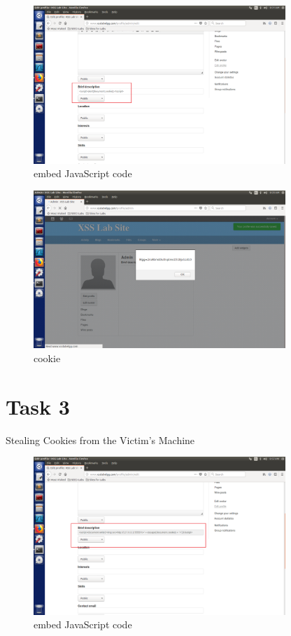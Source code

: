 \documentclass[onecolumn,oneside]{SUSTechHomework}
\begin{document}
  \begin{figure}[H]
    \centering
    \includegraphics[width=0.85\textwidth]{img/task2_1.png}
    \caption{embed JavaScript code}
  \end{figure}

  \begin{figure}[H]
    \centering
    \includegraphics[width=0.85\textwidth]{img/task2_2.png}
    \caption{cookie}
  \end{figure}

  \section*{Task 3}
  Stealing Cookies from the Victim’s Machine

  \begin{figure}[H]
    \centering
    \includegraphics[width=0.85\textwidth]{img/task3_1.png}
    \caption{embed JavaScript code} 
  \end{figure}
\end{document}
